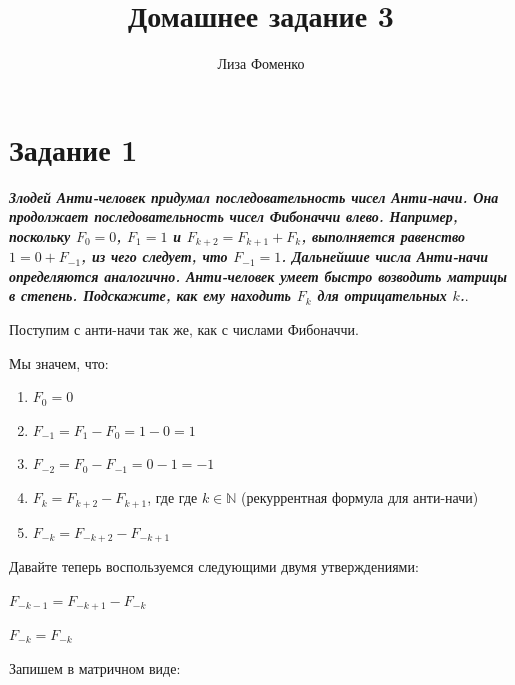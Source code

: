 \documentclass{article}
\title{Домашнее задание 3}
\author{Лиза Фоменко}
\date{}
\begin{document}
\maketitle



\section*{\textbf{Задание 1}} \textbf{\textit{Злодей Анти-человек придумал последовательность чисел Анти-начи. Она продолжает последовательность чисел Фибоначчи влево. Например, поскольку $F_0 = 0$, $F_1 = 1$ и $F_{k+2} = F_{k+1} + F_k$, выполняется равенство $1 = 0 + F_{-1}$, из чего следует, что $F_{-1} = 1$. Дальнейшие числа Анти-начи определяются аналогично.
Анти-человек умеет быстро возводить матрицы в степень. Подскажите, как ему находить $F_k$ для отрицательных $k$.}}.

Поступим с анти-начи так же, как с числами Фибоначчи. 

Мы значем, что: 
\begin{enumerate}
    \item $F_0 = 0$
    \item $F_{-1} = F_1 - F_0 = 1 - 0 = 1$
    \item $F_{-2} = F_0 - F_{-1} = 0 - 1 = -1$
    \item $F_{k} = F_{k+2} - F_{k+1}$, где где $k \in \mathbb{N}$ (рекуррентная формула для анти-начи)
    \item $F_{-k} = F_{-k+2} - F_{-k+1}$
\end{enumerate}

Давайте теперь воспользуемся следующими двумя утверждениями:

$F_{-k-1} = F_{-k+1} - F_{-k}$

$F_{-k} = F_{-k}$

Запишем в матричном виде:
\end{document}
